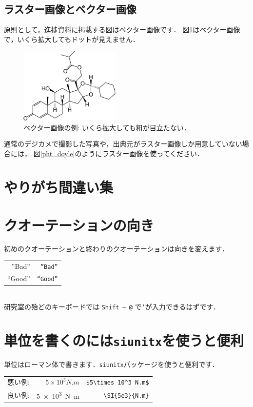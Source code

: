 \documentclass[a4j, dvipdfmx]{jsarticle}
\begin{document}
  \subsection{ラスター画像とベクター画像}
    原則として，進捗資料に掲載する図はベクター画像です．
    図\ref{fig_ciclesonide}はベクター画像で，いくら拡大してもドットが見えません．
      \begin{figure}[tbp]
        \centering
        \includegraphics[width = 5cm]{figure/chemi_vec.pdf}
        \caption{ベクター画像の例: いくら拡大しても粗が目立たない．} \label{fig_ciclesonide}
      \end{figure}
    通常のデジカメで撮影した写真や，出典元がラスター画像しか用意していない場合には，
    図\ref{pht_doyle}のようにラスター画像を使ってください．

\section{やりがち間違い集}
\section{クオーテーションの向き}
  初めのクオーテーションと終わりのクオーテーションは向きを変えます．
  \\
    \begin{tabular}{r|r}
      ''Bad'' & \texttt{''Bad''} \\
      ``Good'' & \texttt{``Good''}
    \end{tabular}
  \\
  研究室の殆どのキーボードでは \texttt{Shift} $+$ \texttt{@} で\texttt{`}が入力できるはずです．
\section{単位を書くのには\texttt{siunitx}を使うと便利}
  単位はローマン体で書きます．\texttt{siunitx}パッケージを使うと便利です．
  \\
    \begin{tabular}{r|r|r}
      悪い例: & $5\times 10^3 N.m$ & \verb|$5\times 10^3 N.m$| \\
      良い例: & \SI{5e3}{N.m} & \verb|\SI{5e3}{N.m}|
    \end{tabular}
\end{document}
